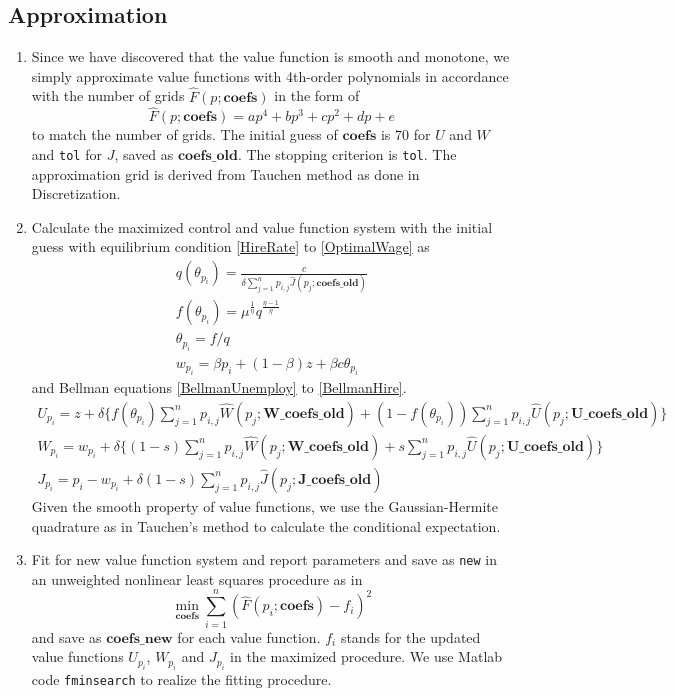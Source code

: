 \documentclass[10pt]{article} %
\begin{document}
    \subsection{Approximation}
    \begin{enumerate}\addtocounter{enumi}{-1}
        \item Since we have discovered that the value function is smooth and monotone, we simply approximate value functions with 4th-order polynomials in accordance with the number of grids \(\hat{F}(p;\textbf{coefs})\) in the form of \[\hat{F}(p; \textbf{coefs}) = a p^4 + bp^3 + cp^2+dp+e \] to match the number of grids. The initial guess of $\textbf{coefs}$ is 70 for $U$ and $W$ and \texttt{tol} for $J$, saved as $\textbf{coefs\_old}$. The stopping criterion is \texttt{tol}. The approximation grid is derived from Tauchen method as done in Discretization.
        \item Calculate the maximized control and value function system with the initial guess with equilibrium condition \ref{HireRate} to \ref{OptimalWage} as
        \begin{gather*}
            q(\theta_{p_i}) = \frac{c}{\delta \sum_{j=1}^{n}p_{i,j}\hat{J}(p_j;\textbf{coefs\_old})}\\
            f(\theta_{p_i}) = \mu^\frac{1}{\eta} q^\frac{\eta-1}{\eta}\\
            \theta_{p_i} = f/q\\
            w_{p_i} = \beta p_i + (1-\beta)z + \beta c \theta_{p_i}
        \end{gather*}
        and Bellman equations \ref{BellmanUnemploy} to \ref{BellmanHire}. 
        \begin{gather*}
            U_{p_i} = z + \delta\{f(\theta_{p_i})\sum_{j=1}^{n}p_{i,j}\hat{W}(p_j;\textbf{W\_coefs\_old}) + (1-f(\theta_{p_i}))\sum_{j=1}^{n}p_{i,j}\hat{U}(p_j;\textbf{U\_coefs\_old})\}\\
            W_{p_i} = w_{p_i} + \delta\{(1-s)\sum_{j=1}^{n}p_{i,j}\hat{W}(p_j;\textbf{W\_coefs\_old}) + s\sum_{j=1}^{n}p_{i,j}\hat{U}(p_j;\textbf{U\_coefs\_old})\}\\
            J_{p_i} = p_i - w_{p_i} + \delta (1-s)\sum_{j=1}^{n}p_{i,j}\hat{J}(p_j;\textbf{J\_coefs\_old})
        \end{gather*}
        Given the smooth property of value functions, we use the Gaussian-Hermite quadrature as in Tauchen's method to calculate the conditional expectation.
        \item Fit for new value function system and report parameters and save as \texttt{new} in an unweighted nonlinear least squares procedure as in \[\min\limits_\textbf{coefs} \sum\limits_{i=1}^{n}(\hat{F}(p_i;\textbf{coefs})-f_i)^2\] and save as \(\textbf{coefs\_new}\) for each value function. $f_i$ stands for the updated value functions $U_{p_i}$, $W_{p_i}$ and $J_{p_i}$ in the maximized procedure. We use Matlab code \texttt{fminsearch} to realize the fitting procedure.

\end{enumerate}
\end{document}

